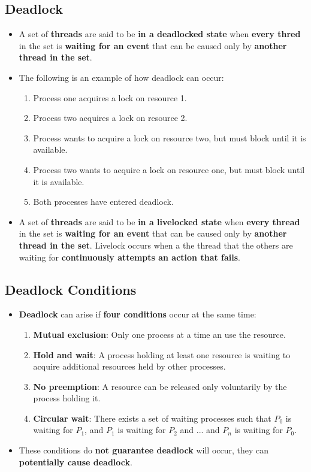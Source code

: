 \documentclass{article}
\begin{document}
    \subsection*{Deadlock}
    \begin{itemize}
        \item A set of \textbf{threads} are said to be \textbf{in a deadlocked state} when \textbf{every thred} in the set is \textbf{waiting for an event} that can be caused only by \textbf{another thread in the set}.
        \item The following is an example of how deadlock can occur:
        \begin{enumerate}
            \item Process one acquires a lock on resource 1.
            \item Process two acquires a lock on resource 2.
            \item Process wants to acquire a lock on resource two, but must block until it is available.
            \item Process two wants to acquire a lock on resource one, but must block until it is available.
            \item Both processes have entered deadlock.
        \end{enumerate}
        \item A set of \textbf{threads} are said to be \textbf{in a livelocked state} when \textbf{every thread} in the set is \textbf{waiting for an event} that can be caused only by \textbf{another thread in the set}. Livelock occurs when a the thread that the others are waiting for \textbf{continuously attempts an action that fails}.
    \end{itemize}

    \subsection*{Deadlock Conditions}
    \begin{itemize}
        \item \textbf{Deadlock} can arise if \textbf{four conditions} occur at the same time:
        \begin{enumerate}
            \item \textbf{Mutual exclusion}: Only one process at a time an use the resource.
            \item \textbf{Hold and wait}: A process holding at least one resource is waiting to acquire additional resources held by other processes.
            \item \textbf{No preemption}: A resource can be released only voluntarily by the process holding it.
            \item \textbf{Circular wait}: There exists a set of waiting processes such that $P_0$ is waiting for $P_1$, and $P_1$ is waiting for $P_2$ and ... and $P_n$ is waiting for $P_0$.
        \end{enumerate}
        \item These conditions do \textbf{not guarantee deadlock} will occur, they can \textbf{potentially cause deadlock}.
    \end{itemize}
\end{document}
